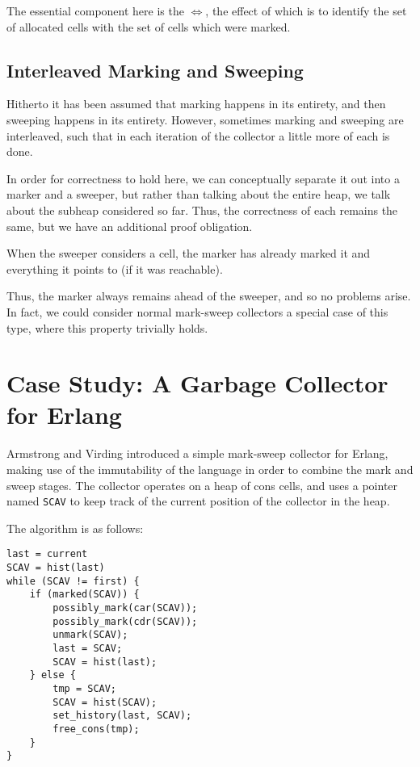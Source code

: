 The essential component here is the $\iff$, the effect of which is to
identify the set of allocated cells with the set of cells which were
marked.

\subsection{Interleaved Marking and Sweeping}
\label{sec:marksweep-sweeping-interleaved}

Hitherto it has been assumed that marking happens in its entirety, and
then sweeping happens in its entirety. However, sometimes marking and
sweeping are interleaved, such that in each iteration of the collector
a little more of each is done.

In order for correctness to hold here, we can conceptually separate it
out into a marker and a sweeper, but rather than talking about the
entire heap, we talk about the subheap considered so far. Thus, the
correctness of each remains the same, but we have an additional proof
obligation.

\begin{definition}
  \label{def:ms-interleaved}
  When the sweeper considers a cell, the marker has already marked it
  and everything it points to (if it was reachable).
\end{definition}

Thus, the marker always remains ahead of the sweeper, and so no
problems arise. In fact, we could consider normal mark-sweep
collectors a special case of this type, where this property trivially
holds.

\section{Case Study: A Garbage Collector for Erlang}
\label{sec:marksweep-example}

Armstrong and Virding\cite{Armstrong95} introduced a simple mark-sweep
collector for Erlang, making use of the immutability of the language
in order to combine the mark and sweep stages. The collector operates
on a heap of cons cells, and uses a pointer named \texttt{SCAV} to
keep track of the current position of the collector in the heap.

The algorithm is as follows:

\begin{lstlisting}
last = current
SCAV = hist(last)
while (SCAV != first) {
    if (marked(SCAV)) {
        possibly_mark(car(SCAV));
        possibly_mark(cdr(SCAV));
        unmark(SCAV);
        last = SCAV;
        SCAV = hist(last);
    } else {
        tmp = SCAV;
        SCAV = hist(SCAV);
        set_history(last, SCAV);
        free_cons(tmp);
    }
}
\end{lstlisting}

